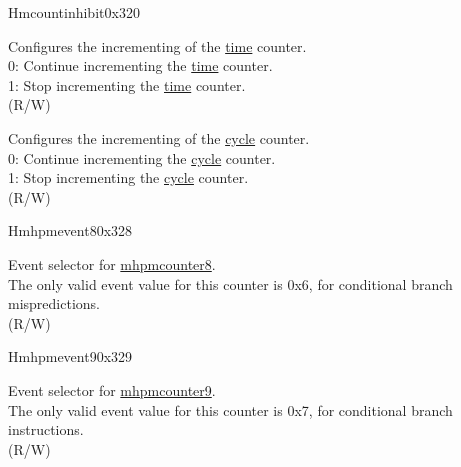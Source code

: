 \begin{register}{H}{mcountinhibit}{0x320}
\begin{regdesc}
\begin{reglist}
\label{fielddesc:MCOUNTINHIBIT_TM}\item [TM] Configures the incrementing of the \hyperref[regdesc:TIME]{time} counter. \\
0: Continue incrementing the \hyperref[regdesc:TIME]{time} counter.\\
1: Stop incrementing the \hyperref[regdesc:TIME]{time} counter. \\
(R/W)
\label{fielddesc:MCOUNTINHIBIT_CY}\item [CY] Configures the incrementing of the \hyperref[regdesc:CYCLE]{cycle} counter. \\
0: Continue incrementing the \hyperref[regdesc:CYCLE]{cycle} counter.\\
1: Stop incrementing the \hyperref[regdesc:CYCLE]{cycle} counter.\\
(R/W)\\
\end{reglist}\end{regdesc}
\end{register}

\begin{register}{H}{mhpmevent8}{0x328}\label{regdesc:MHPMEVENT8}
%
%
\regnewline%
\begin{regdesc}\begin{reglist}
\label{fielddesc:MHPMEVENT8_EVENT}\item [{EVENT[4:0]}] Event selector for \hyperref[regdesc:MHPMCOUNTER8]{mhpmcounter8}.\\
The only valid event value for this counter is 0x6, for conditional branch mispredictions.\\
(R/W)
\end{reglist}\end{regdesc}
\end{register}

\begin{register}{H}{mhpmevent9}{0x329}\label{regdesc:MHPMEVENT9}
%
%
\regnewline%
\begin{regdesc}\begin{reglist}
\label{fielddesc:MHPMEVENT9_EVENT}\item [{EVENT[4:0]}] Event selector for \hyperref[regdesc:MHPMCOUNTER9]{mhpmcounter9}.\\
The only valid event value for this counter is 0x7, for conditional branch instructions.\\
(R/W)
\end{reglist}\end{regdesc}
\end{register}

